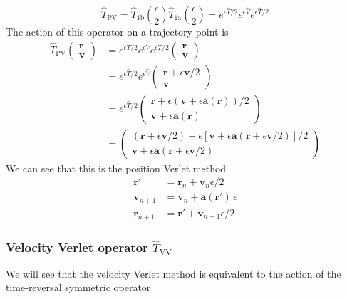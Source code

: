 \documentclass[8pt,a4paper]{article}
\begin{document}
	\begin{equation}
		\hat{T}_\mathrm{PV} = \hat{T}_\mathrm{1b}\left(\frac{\epsilon}{2}\right) \hat{T}_\mathrm{1a}\left(\frac{\epsilon}{2}\right) = e^{\epsilon \hat{T}/2}e^{\epsilon \hat{V}} e^{\epsilon \hat{T}/2}
	\end{equation}
	The action of this operator on a trajectory point is
	\begin{align}
		\hat{T}_\mathrm{PV}
		\begin{pmatrix}
			\mathbf{r} \\ \mathbf{v}
		\end{pmatrix}
		&= e^{\epsilon \hat{T}/2}e^{\epsilon \hat{V}} e^{\epsilon \hat{T}/2}
		\begin{pmatrix}
			\mathbf{r} \\ \mathbf{v}
		\end{pmatrix} \nonumber \\
		&= e^{\epsilon \hat{T}/2}e^{\epsilon \hat{V}}
		\begin{pmatrix}
			\mathbf{r} + \epsilon \mathbf{v}/2  \\
			\mathbf{v}
		\end{pmatrix} \nonumber \\
		&= e^{\epsilon \hat{T}/2}
		\begin{pmatrix}
			\mathbf{r} + \epsilon (\mathbf{v} + \epsilon\mathbf{a}(\mathbf{r}))/2  \\
			\mathbf{v} + \epsilon\mathbf{a}(\mathbf{r})
		\end{pmatrix} \nonumber \\
		&=
		\begin{pmatrix}
			(\mathbf{r} + \epsilon \mathbf{v}/2) + \epsilon [\mathbf{v} + \epsilon\mathbf{a}(\mathbf{r} + \epsilon \mathbf{v}/2)]/2  \\
			\mathbf{v} + \epsilon\mathbf{a}(\mathbf{r} + \epsilon \mathbf{v}/2)
		\end{pmatrix}
	\end{align}
	We can see that this is the position Verlet method
	\begin{align}
		\mathbf{r}'  &= \mathbf{r}_n + \mathbf{v}_{n} \epsilon /2\nonumber \\
		\mathbf{v}_{n+1} &= \mathbf{v}_n + \mathbf{a}(\mathbf{r}') \, \epsilon \nonumber \\
		\mathbf{r}_{n+1} &= \mathbf{r}' + \mathbf{v}_{n+1} \epsilon/2
	\end{align}
	
	\subsubsection{Velocity Verlet operator $\hat{T}_\mathrm{VV}$}
	We will see that the velocity Verlet method is equivalent to the action of the time-reversal symmetric operator
	
\end{document}
